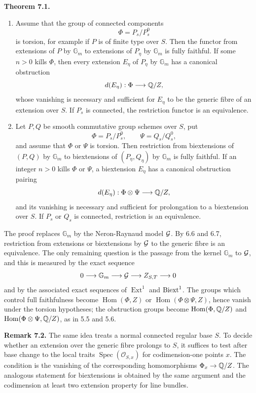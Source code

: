 \documentclass[11pt]{article}
\providecommand{\Spec}{\operatorname{Spec}}
\providecommand{\Gm}{\mathbb G_m}
\providecommand{\Hom}{\operatorname{Hom}}
\providecommand{\Ext}{\operatorname{Ext}}
\begin{document}
\textbf{Theorem 7.1.}
\begin{enumerate}[label=\alph*)]
\item Assume that the group of connected components
\[
  \Phi=P_s/P_s^0
\]
is torsion, for example if \(P\) is of finite type over \(S\).  Then the functor from extensions of \(P\) by \(\Gm\) to extensions of \(P_\eta\) by \(\Gm\) is fully faithful.  If some \(n>0\) kills \(\Phi\), then every extension \(E_\eta\) of \(P_\eta\) by \(\Gm\) has a canonical obstruction
\[
  d(E_\eta):\Phi\longrightarrow \mathbb Q/Z,
\]
whose vanishing is necessary and sufficient for \(E_\eta\) to be the generic fibre of an extension over \(S\).  If \(P_s\) is connected, the restriction functor is an equivalence.
\item Let \(P,Q\) be smooth commutative group schemes over \(S\), put
\[
  \Phi=P_s/P_s^0,
  \qquad
  \Psi=Q_s/Q_s^0,
\]
and assume that \(\Phi\) or \(\Psi\) is torsion.  Then restriction from biextensions of \((P,Q)\) by \(\Gm\) to biextensions of \((P_\eta,Q_\eta)\) by \(\Gm\) is fully faithful.  If an integer \(n>0\) kills \(\Phi\) or \(\Psi\), a biextension \(E_\eta\) has a canonical obstruction pairing
\[
  d(E_\eta):\Phi\otimes\Psi\longrightarrow \mathbb Q/Z,
\]
and its vanishing is necessary and sufficient for prolongation to a biextension over \(S\).  If \(P_s\) or \(Q_s\) is connected, restriction is an equivalence.
\end{enumerate}

The proof replaces \(\Gm\) by the Neron-Raynaud model \(\mathcal G\).  By 6.6 and 6.7, restriction from extensions or biextensions by \(\mathcal G\) to the generic fibre is an equivalence.  The only remaining question is the passage from the kernel \(\Gm\) to \(\mathcal G\), and this is measured by the exact sequence
\[
  0\longrightarrow \Gm\longrightarrow \cG\longrightarrow Z_{S,T}\longrightarrow 0
\]
and by the associated exact sequences of \(\Ext^1\) and \(\operatorname{Biext}^1\).  The groups which control full faithfulness become \(\Hom(\Phi,Z)\) or \(\Hom(\Phi\otimes\Psi,Z)\), hence vanish under the torsion hypotheses; the obstruction groups become \(\Hom(\Phi,\QQ/Z)\) and \(\Hom(\Phi\otimes\Psi,\QQ/Z)\), as in 5.5 and 5.6.

\textbf{Remark 7.2.}  The same idea treats a normal connected regular base \(S\).  To decide whether an extension over the generic fibre prolongs to \(S\), it suffices to test after base change to the local traits \(\Spec(\mathcal O_{S,x})\) for codimension-one points \(x\).  The condition is the vanishing of the corresponding homomorphisms \(\Phi_x\to\mathbb Q/Z\).  The analogous statement for biextensions is obtained by the same argument and the codimension at least two extension property for line bundles.
\end{document}

